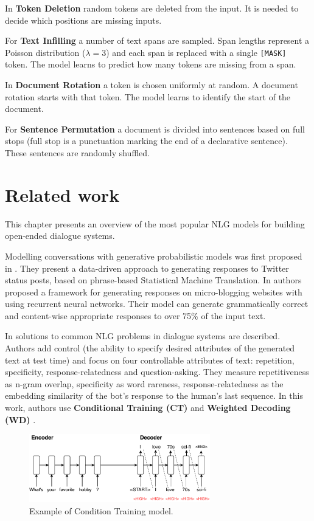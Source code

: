 In \textbf{Token Deletion} random tokens are deleted from the input. It is needed to decide which positions are missing inputs.

For \textbf{Text Infilling} a number of text spans are sampled. Span lengths represent a Poisson distribution ($\lambda=3$) and each span is replaced with a single \texttt{[MASK]} token. The model learns to predict how many tokens are missing from a span.

In \textbf{Document Rotation} a token is chosen uniformly at random. A document rotation starts with that token. The model learns to identify the start of the document.

For \textbf{Sentence Permutation} a document is divided into sentences based on full stops (full stop is a punctuation marking the end of a declarative sentence). These sentences are randomly shuffled.

\chapter{Related work} \label{related_work}
This chapter presents an overview of the most popular NLG models for building open-ended dialogue systems. 

Modelling conversations with generative probabilistic models was first proposed in \cite{ritter2011data}. They present a data-driven approach to generating responses to Twitter status posts, based on phrase-based Statistical Machine Translation. In \cite{shang2015neural} authors proposed a framework for generating responses on micro-blogging websites with using recurrent neural networks. Their model can generate grammatically correct and content-wise appropriate responses to over 75\% of the input text.

In \cite{see2019makes} solutions to common NLG problems in dialogue systems are described. Authors add control (the ability to specify desired attributes of the generated text at test time) and focus on four controllable attributes of text: repetition, specificity, response-relatedness and question-asking. They measure repetitiveness as n-gram overlap, specificity as word rareness, response-relatedness as the embedding similarity of the bot’s response to the human’s last sequence. In this work, authors use \textbf{Conditional Training (CT)} \cite{peng2018towards} and \textbf{Weighted Decoding (WD)} \cite{ghazvininejad2017hafez}. 

\begin{figure}[hbt]
  \centering
  \includegraphics[width=0.7\textwidth]{figures/ct.pdf}
  \caption{Example of Condition Training model.}
  \label{fig:ct}
\end{figure}


